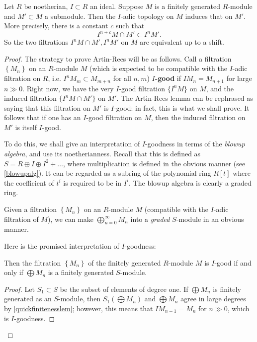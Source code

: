 \begin{theorem}
\label{artinrees}
Let $R$ be noetherian, $I \subset R$ an
ideal. Suppose $M$ is a finitely generated $R$-module and $M' \subset M$ a
submodule. Then the $I$-adic topology on $M$ induces that on $M'$.
More precisely,
there is a  constant $c$ such that
\[ I^{n+c} M \cap M' \subset I^n M'.  \]
So the two filtrations $I^n M \cap M', I^n M'$ on $M$ are equivalent up to a
shift.
\end{theorem} 
\begin{proof} 
The strategy to prove Artin-Rees will be as follows. Call a filtration
$\left\{M_n\right\}$ on an $R$-module $M$ (which is expected to be compatible
with the $I$-adic filtration on $R$, i.e. $I^n M_m \subset M_{m+n}$ for all
$n,m$) \textbf{$I$-good} if $I M_{n} = M_{n+1}$ for large $n \gg 0$.
Right now, we have the very $I$-good filtration $\{I^n M\}$ on $M$, and the induced
filtration $\{I^n M \cap M'\}$ on $M'$. The Artin-Rees lemma can be rephrased
as saying that this filtration on $M'$ is $I$-good: in fact, this is what we
shall prove.
It follows that if one has an $I$-good filtration on $M$, then the induced
filtration on  $M'$ is itself $I$-good.

To do this, we shall give an interpretation of $I$-goodness in terms of the 
\emph{blowup algebra}, and use its noetherianness.
Recall that this is defined as $S = R \oplus I \oplus I^2  +
\dots$, where multiplication is defined in the obvious manner (see
\cref{blowupalg}). It can be regarded as a subring
of the polynomial ring 
$R[t]$ where the coefficient of $t^i$ is required to be in $I^i$. 
The blowup algebra is clearly a graded ring.

Given a filtration $\left\{M_n\right\}$ on an $R$-module $M$ (compatible with
the $I$-adic filtration of $M$), we can  make $\bigoplus_{n=0}^{\infty} M_n$
into a \emph{graded} $S$-module in an obvious manner.

Here is the promised interpretation of $I$-goodness:
\begin{lemma} \label{subartinrees}
 Then the
filtration $\left\{M_n\right\}$ of the finitely generated $R$-module $M$ is
$I$-good if and only if $\bigoplus M_n$ is a finitely generated $S$-module.
\end{lemma} 
\begin{proof}
Let $S_1 \subset S$ be the subset of elements of degree one.
If $\bigoplus M_n$ is finitely generated as an $S$-module, then $S_1
(\bigoplus M_n) $ and $\bigoplus M_n$ agree in large degrees by
\cref{quickfinitenesslem};
however, this means that $IM_{n-1} = M_{n}$ for $n\gg 0$, which is $I$-goodness.


\end{proof}
\end{proof}
